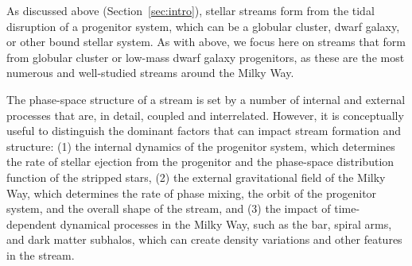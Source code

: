 \documentclass[final,5p,times,twocolumn,authoryear]{elsarticle}
\begin{document}

As discussed above (Section~\ref{sec:intro}), stellar streams form from the tidal
disruption of a progenitor system, which can be a globular cluster, dwarf galaxy, or
other bound stellar system.
As with above, we focus here on streams that form from globular cluster or low-mass
dwarf galaxy progenitors, as these are the most numerous and well-studied streams around
the Milky Way.

The phase-space structure of a stream is set by a number of internal and external
processes that are, in detail, coupled and interrelated.
However, it is conceptually useful to distinguish the dominant factors that can impact
stream formation and structure:
(1) the internal dynamics of the progenitor system, which determines the rate of stellar
ejection from the progenitor and the phase-space distribution function of the stripped
stars,
(2) the external gravitational field of the Milky Way, which determines the rate of
phase mixing, the orbit of the progenitor system, and the overall shape of the stream,
and
(3) the impact of time-dependent dynamical processes in the Milky Way, such as the bar,
spiral arms, and dark matter subhalos, which can create density variations and other
features in the stream.
\end{document}
